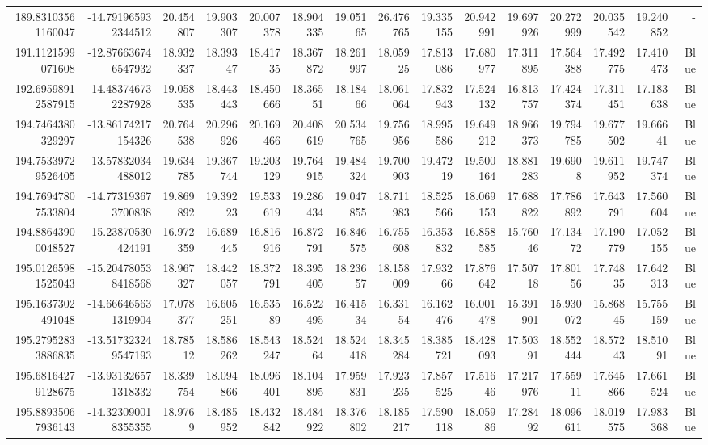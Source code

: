 \begin{center}
\begin{longtable}{rrrrrrrrrrrrrrr}
189.83103561160047 & -14.791965932344512 & 20.454807 & 19.903307 & 20.007378 & 18.904335 & 19.05165 & 26.476765 & 19.335155 & 20.942991 & 19.697926 & 20.272999 & 20.035542 & 19.240852 & - \\
191.1121599071608 & -12.876636746547932 & 18.932337 & 18.39347 & 18.41735 & 18.367872 & 18.261997 & 18.05925 & 17.813086 & 17.680977 & 17.311895 & 17.564388 & 17.492775 & 17.410473 & Blue \\
192.69598912587915 & -14.483746732287928 & 19.058535 & 18.443443 & 18.450666 & 18.36551 & 18.18466 & 18.061064 & 17.832943 & 17.524132 & 16.813757 & 17.424374 & 17.311451 & 17.183638 & Blue \\
194.7464380329297 & -13.86174217154326 & 20.764538 & 20.296926 & 20.169466 & 20.408619 & 20.534765 & 19.756956 & 18.995586 & 19.649212 & 18.966373 & 19.794785 & 19.677502 & 19.66641 & Blue \\
194.75339729526405 & -13.57832034488012 & 19.634785 & 19.367744 & 19.203129 & 19.764915 & 19.484324 & 19.700903 & 19.47219 & 19.500164 & 18.881283 & 19.6908 & 19.611952 & 19.747374 & Blue \\
194.76947807533804 & -14.773193673700838 & 19.869892 & 19.39223 & 19.533619 & 19.286434 & 19.047855 & 18.711983 & 18.525566 & 18.069153 & 17.688822 & 17.786892 & 17.643791 & 17.560604 & Blue \\
194.88643900048527 & -15.23870530424191 & 16.972359 & 16.689445 & 16.816916 & 16.872791 & 16.846575 & 16.755608 & 16.353832 & 16.858585 & 15.76046 & 17.13472 & 17.190779 & 17.052155 & Blue \\
195.01265981525043 & -15.204780538418568 & 18.967327 & 18.442057 & 18.372791 & 18.395405 & 18.23657 & 18.158009 & 17.93266 & 17.876642 & 17.50718 & 17.80156 & 17.74835 & 17.642313 & Blue \\
195.1637302491048 & -14.666465631319904 & 17.078377 & 16.605251 & 16.53589 & 16.522495 & 16.41534 & 16.33154 & 16.162476 & 16.001478 & 15.391901 & 15.930072 & 15.86845 & 15.755159 & Blue \\
195.27952833886835 & -13.517323249547193 & 18.78512 & 18.586262 & 18.543247 & 18.52464 & 18.524418 & 18.345284 & 18.385721 & 18.428093 & 17.50391 & 18.552444 & 18.57243 & 18.51091 & Blue \\
195.68164279128675 & -13.931326571318332 & 18.339754 & 18.094866 & 18.096401 & 18.104895 & 17.959831 & 17.923235 & 17.857525 & 17.51646 & 17.217976 & 17.55911 & 17.645866 & 17.661524 & Blue \\
195.88935067936143 & -14.323090018355355 & 18.9769 & 18.485952 & 18.432842 & 18.484922 & 18.376802 & 18.185217 & 17.590118 & 18.05986 & 17.28492 & 18.096611 & 18.019575 & 17.983368 & Blue \\

\end{longtable}
\end{center}
